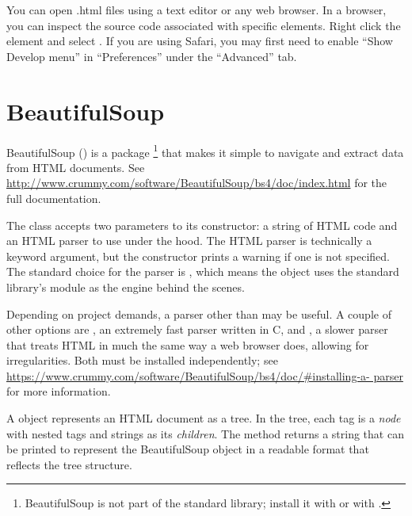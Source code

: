 \begin{info}
You can open .html files using a text editor or any web browser.
In a browser, you can inspect the source code associated with specific elements.
Right click the element and select .
If you are using Safari, you may first need to enable ``Show Develop menu'' in ``Preferences'' under the ``Advanced'' tab.
\end{info}

\section*{BeautifulSoup} %

BeautifulSoup () is a package%
\footnote{BeautifulSoup is not part of the standard library; install it with  or with .} that makes it simple to navigate and extract data from HTML documents.
See \url{http://www.crummy.com/software/BeautifulSoup/bs4/doc/index.html} for the full documentation.

The  class accepts two parameters to its constructor: a string of HTML code and an HTML parser to use under the hood.
The HTML parser is technically a keyword argument, but the constructor prints a warning if one is not specified.
The standard choice for the parser is , which means the object uses the standard library's  module as the engine behind the scenes.

\begin{info}
Depending on project demands, a parser other than  may be useful.
A couple of other options are , an extremely fast parser written in C, and , a slower parser that treats HTML in much the same way a web browser does, allowing for irregularities.
Both must be installed independently; see \url{https://www.crummy.com/software/BeautifulSoup/bs4/doc/\#installing-a-	parser} for more information.
\end{info}

\vspace{5mm}
A  object represents an HTML document as a tree.
In the tree, each tag is a \emph{node} with nested tags and strings as its \emph{children}.
The  method returns a string that can be printed to represent the BeautifulSoup object in a readable format that reflects the tree structure.

